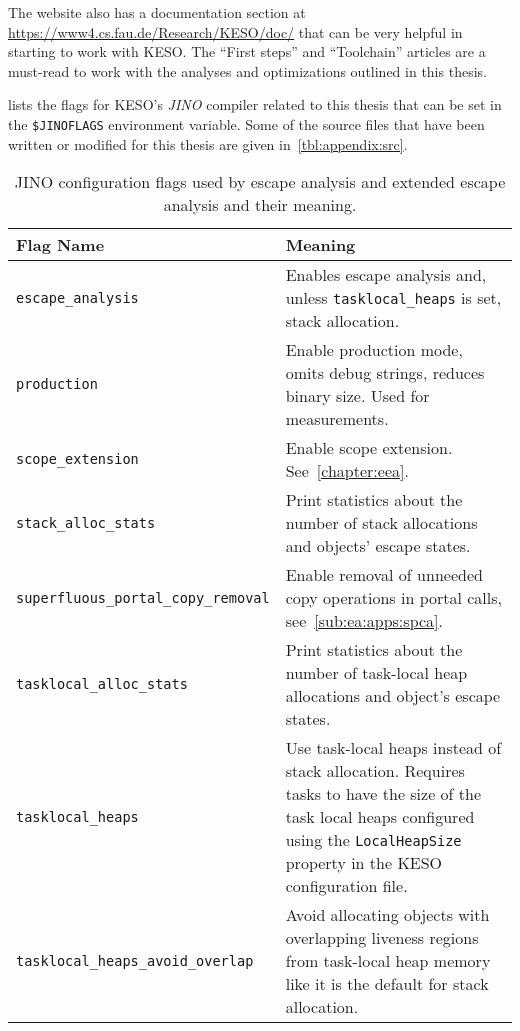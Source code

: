 		The website also has a documentation section at \url{https://www4.cs.fau.de/Research/KESO/doc/} that can be very
		helpful in starting to work with KESO. The \enquote{First steps} and \enquote{Toolchain} articles are a must-read to
		work with the analyses and optimizations outlined in this thesis.

		 lists the flags for KESO's \emph{JINO} compiler related to this thesis that can be set
		in the \texttt{\$JINOFLAGS} environment variable. Some of the source files that have been written or modified for
		this thesis are given in~\cref{tbl:appendix:src}.

		\begin{table}[p]
			\centering
			{\footnotesize
				\begin{tabular}{p{}p{}}
					\textbf{Flag Name}                          & \textbf{Meaning} \\ \hline\hline
					{\scriptsize\texttt{escape\_analysis}} &
						Enables escape analysis and, unless \texttt{tasklocal\_heaps} is set, stack allocation.\\
					{\scriptsize\texttt{production}} &
						Enable production mode, omits debug strings, reduces binary size. Used for measurements.\\
					{\scriptsize\texttt{scope\_extension}} &
						Enable scope extension. See~\cref{chapter:eea}.\\
					{\scriptsize\texttt{stack\_alloc\_stats}} &
						Print statistics about the number of stack allocations and objects' escape states.\\
					{\scriptsize\texttt{superfluous\_portal\_copy\_removal}} &
						Enable removal of unneeded copy operations in portal calls, see~\cref{sub:ea:apps:spca}.\\
					{\scriptsize\texttt{tasklocal\_alloc\_stats}} &
						Print statistics about the number of task-local heap allocations and object's escape states.\\
					{\scriptsize\texttt{tasklocal\_heaps}} &
						Use task-local heaps instead of stack allocation. Requires tasks to have the size of the task local heaps
						configured using the \texttt{LocalHeapSize} property in the KESO configuration file.\\
					{\scriptsize\texttt{tasklocal\_heaps\_avoid\_overlap}} &
						Avoid allocating objects with overlapping liveness regions from task-local heap memory like it is the
						default for stack allocation.
				\end{tabular}
			}
			\caption{JINO configuration flags used by escape analysis and extended escape analysis and their meaning.}
			\label{tbl:appendix:jinoflags}
		\end{table}

